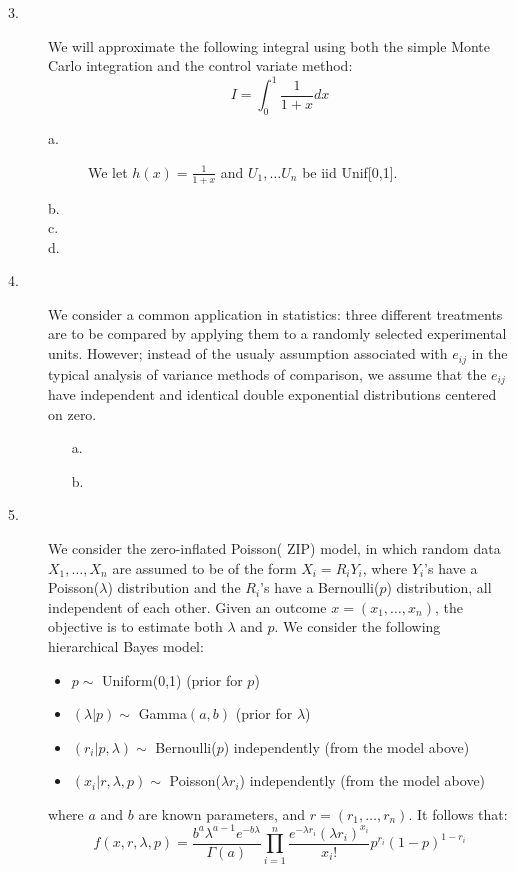 \documentclass[12pt]{article}
\begin{document}
\begin{description}
\item[3.] We will approximate the following integral using both the simple Monte Carlo integration and the control variate method:
\[I = \int_0^1 \frac{1}{1 + x} dx\]

\begin{description}
\item[a.]We let $h(x) = \frac{1}{1+x}$ and $U_1, \dots U_n$ be iid Unif[0,1]. 
\item[b.]
\item[c.]
\item[d.]
\end{description}



\item[4.] We consider a common application in statistics: three different treatments are to be compared by applying them to a randomly selected experimental units. However; instead of the usualy assumption associated with $e_{ij}$ in the typical analysis of variance methods of comparison, we assume that the $e_{ij}$  have independent and identical double exponential distributions centered on zero.
\begin{itemize}
\item[a.]
\item[b.]
\end{itemize}



\item[5.] We consider the zero-inflated Poisson( ZIP) model, in which random data $X_1, \dots, X_n$ are assumed to be of the form $X_i = R_iY_i$, where $Y_i$'s have a Poisson($\lambda$) distribution and the $R_i$'s have a Bernoulli($p$) distribution, all independent of each other. Given an outcome $x = (x_1, \dots, x_n)$, the objective is to estimate both $\lambda$ and $p$. We consider the following hierarchical Bayes model:
\begin{itemize}
\item $p \sim$ Uniform(0,1) (prior for $p$)
\item $(\lambda | p) \sim$ Gamma$(a, b)$ (prior for $\lambda$)
\item $(r_i | p, \lambda) \sim$ Bernoulli($p$) independently (from the model above)
\item $(x_i | r, \lambda, p) \sim$ Poisson($\lambda r_i$) independently (from the model above)
\end{itemize}
where $a$ and $b$ are known parameters, and $r = (r_1, \dots, r_n)$. It follows that:
\[f(x, r, \lambda, p) = \frac{b^a\lambda^{a-1}e^{-b\lambda}}{\Gamma(a)}\prod^n_{i = 1} \frac{e^{-\lambda r_i} (\lambda r_i)^{x_i}}{x_i!} p^{r_i} (1 - p)^{1 - r_i}\]


\end{description}
\end{document}
